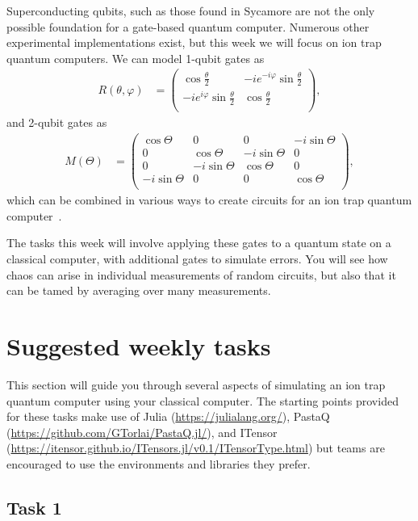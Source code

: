 \documentclass[12pt]{article}
\renewcommand{\phi}{\varphi}
\begin{document}
Superconducting qubits, such as those found in Sycamore are not the only possible foundation for a gate-based quantum computer.
Numerous other experimental implementations exist, but this week we will focus on ion trap quantum computers.
We can model 1-qubit gates as
\begin{align}
	R(\theta, \phi)
	&= \begin{pmatrix}
			\cos{\frac{\theta}{2}} & -i e^{-i \phi} \sin{\frac{\theta}{2}} \\
			-i e^{i \phi} \sin{\frac{\theta}{2}} & \cos{\frac{\theta}{2}} \\
		\end{pmatrix},
\end{align}
and 2-qubit gates as
\begin{align}
	M(\Theta)
	&= \begin{pmatrix}
			\cos{\Theta} & 0 & 0 & -i \sin{\Theta} \\
			0 & \cos{\Theta} & -i \sin{\Theta} & 0 \\
			0 & -i \sin{\Theta} & \cos{\Theta} & 0 \\
			-i \sin{\Theta} & 0 & 0 & \cos{\Theta} \\
		\end{pmatrix},
\end{align}
which can be combined in various ways to create circuits for an ion trap quantum computer~\cite{sorensen1999quantum,pogorelov2021compact}.

The tasks this week will involve applying these gates to a quantum state on a classical computer, with additional gates to simulate errors.
You will see how chaos can arise in individual measurements of random circuits, but also that it can be tamed by averaging over many measurements.


\section*{Suggested weekly tasks}

This section will guide you through several aspects of simulating an ion trap quantum computer using your classical computer.
The starting points provided for these tasks make use of Julia (\url{https://julialang.org/}), PastaQ (\url{https://github.com/GTorlai/PastaQ.jl/}), and ITensor (\url{https://itensor.github.io/ITensors.jl/v0.1/ITensorType.html}) but teams are encouraged to use the environments and libraries they prefer.


\subsection*{Task 1}
\end{document}
